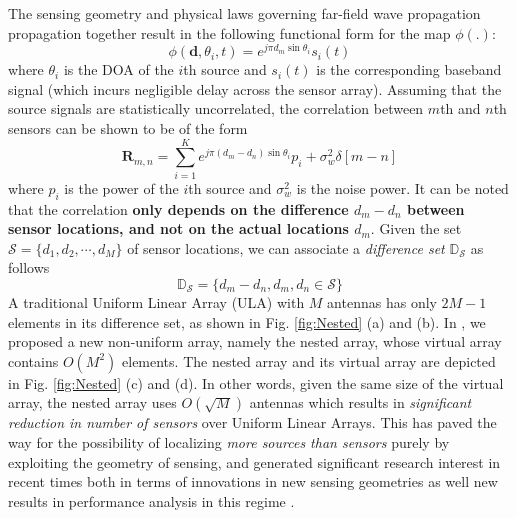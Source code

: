 The sensing geometry and physical laws governing far-field wave propagation propagation together result in the following functional form for the map $\phi(.)$: \[ \phi(\mathbf{d},\theta_i,t) =  e^{j\pi d_m \sin\theta_i}s_i(t)  \]
where $\theta_i$ is the DOA of the $i$th source and $s_i(t)$ is the corresponding baseband signal (which incurs negligible delay across the sensor array). Assuming that the source signals are statistically uncorrelated, the correlation between $m$th and $n$th sensors can be shown to be of the form \[ \mathbf{R}_{m,n} = \sum_{i=1}^{K}e^{j\pi (d_m-d_n)\sin\theta_i} p_i + \sigma^2_w\delta[m-n] \]
where $p_i$ is the power of the $i$th source and $\sigma^2_w$ is the noise power. 
It can be noted that the correlation {\bf only depends on the difference $d_m-d_n$ between sensor locations, and not on the actual locations $d_m$}. %
Given the set $\mathcal{S} = \{d_1,d_2,\cdots, d_M\} $ of sensor locations,  we can associate a {\em difference set} $\mathbb{D}_{\mathcal{S}}$ as follows \[ \mathbb{D}_{\mathcal{S}}=\{d_m-d_n, d_m, d_n\in \mathcal{S} \} \] 
A traditional Uniform Linear Array (ULA) with $M$ antennas has only $2M-1$ elements in its difference set, as shown in Fig. \ref{fig:Nested} (a) and (b). In \cite{PiyaNested}, we proposed a new non-uniform array, namely the nested array, whose virtual array contains $O(M^2)$ elements. 
The nested array and its virtual array are depicted in Fig. \ref{fig:Nested} (c) and (d). In other words, given the same size of the virtual array, the nested array uses $O(\sqrt{M})$ antennas which results in {\em significant reduction in number of sensors} over Uniform Linear Arrays. This has paved the way for the possibility of localizing {\em more sources than sensors} purely by exploiting the geometry of sensing, and generated significant research interest in recent times both in terms of innovations in new sensing geometries \cite{} as well new results in performance analysis in this regime \cite{}. \\


